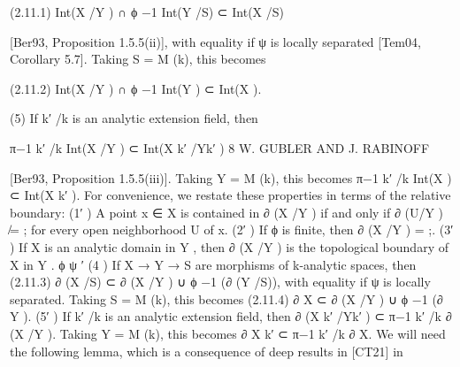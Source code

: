 \documentclass[
  10pt,
]{article}
\newenvironment{Shaded}{}{}
\newcommand{\NormalTok}[1]{#1}
\begin{document}
\begin{Shaded}
\begin{Highlighting}[]
\NormalTok{(2.11.1)                   Int(X /Y ) ∩ ϕ −1 Int(Y /S) ⊂ Int(X /S)}

\NormalTok{        [Ber93, Proposition 1.5.5(ii)], with equality if ψ is locally separated [Tem04,}
\NormalTok{        Corollary 5.7]. Taking S = M (k), this becomes}

\NormalTok{(2.11.2)                      Int(X /Y ) ∩ ϕ −1 Int(Y ) ⊂ Int(X ).}

\NormalTok{   (5) If k′ /k is an analytic extension field, then}

\NormalTok{                                π−1}
\NormalTok{                                 k′ /k}
\NormalTok{                                       Int(X /Y ) ⊂ Int(X k′ /Yk′ )}
\NormalTok{8                                      W. GUBLER AND J. RABINOFF}

\NormalTok{         [Ber93, Proposition 1.5.5(iii)]. Taking Y = M (k), this becomes}
\NormalTok{                                       π−1}
\NormalTok{                                        k′ /k}
\NormalTok{                                              Int(X ) ⊂ Int(X k′ ).}
\NormalTok{For convenience, we restate these properties in terms of the relative boundary:}
\NormalTok{   (1′ ) A point x ∈ X is contained in ∂ (X /Y ) if and only if ∂ (U/Y ) ̸= ; for every open}
\NormalTok{         neighborhood U of x.}
\NormalTok{   (2′ ) If ϕ is finite, then ∂ (X /Y ) = ;.}
\NormalTok{   (3′ ) If X is an analytic domain in Y , then ∂ (X /Y ) is the topological boundary of X}
\NormalTok{         in Y .}
\NormalTok{               ϕ     ψ}
\NormalTok{     ′}
\NormalTok{   (4 ) If X → Y → S are morphisms of k{-}analytic spaces, then}
\NormalTok{(2.11.3)                        ∂ (X /S) ⊂ ∂ (X /Y ) ∪ ϕ −1 (∂ (Y /S)),}
\NormalTok{         with equality if ψ is locally separated. Taking S = M (k), this becomes}
\NormalTok{(2.11.4)                             ∂ X ⊂ ∂ (X /Y ) ∪ ϕ −1 (∂ Y ).}
\NormalTok{    (5′ ) If k′ /k is an analytic extension field, then}
\NormalTok{                                     ∂ (X k′ /Yk′ ) ⊂ π−1}
\NormalTok{                                                       k′ /k}
\NormalTok{                                                             ∂ (X /Y ).}
\NormalTok{         Taking Y = M (k), this becomes}
\NormalTok{                                           ∂ X k′ ⊂ π−1}
\NormalTok{                                                     k′ /k}
\NormalTok{                                                           ∂ X.}
\NormalTok{We will need the following lemma, which is a consequence of deep results in [CT21] in}

\end{Highlighting}
\end{Shaded}
\end{document}
